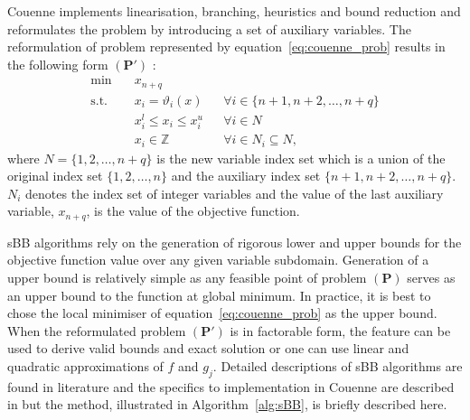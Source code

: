 Couenne implements linearisation, branching, heuristics and bound reduction and reformulates the problem by introducing a set of auxiliary variables. The reformulation of problem represented by equation~\eqref{eq:couenne_prob} results in the following form $(\mathbf{P'})$ \cite{Belotti:2009aa}: 
\begin{equation} \label{eq:couenne_reform}
\begin{aligned}
	\min \quad &x_{n+q}			& \\
	\text{s.t.} \quad &x_i = \vartheta_i \left(x \right)  	& &\forall i \in \{{n+1}, {n+2}, \dots, {n+q} \} \\
	&x_i^l \leq x_i \leq x_i^u	& &\forall i \in N \\
	& x_i \in \mathbb{Z}		& &\forall i \in N_i \subseteq N,
\end{aligned}
\end{equation}
where $N = \{{1}, {2}, \dots, {n+q} \}$ is the new variable index set which is a union of the original index set $\{{1}, {2}, \dots, {n} \}$ and the auxiliary index set $\{{n+1}, {n+2}, \dots, {n+q} \}$. $N_i$ denotes the index set of integer variables and the value of the last auxiliary variable, $x_{n+q}$, is the value of the objective function.

sBB algorithms rely on the generation of rigorous lower and upper bounds for the objective function value over any given variable subdomain. Generation of a upper bound is relatively simple as any feasible point of problem $(\mathbf{P})$ serves as an upper bound to the function at global minimum. In practice, it is best to chose the local minimiser of equation~\eqref{eq:couenne_prob} as the upper bound. When the reformulated problem $(\mathbf{P'})$ is in factorable form, the feature can be used to derive valid bounds and exact solution or one can use linear and quadratic approximations of $f$ and $g_j$. Detailed descriptions of sBB algorithms are found in literature \cite{Smith:1999aa,Liberti:2006aa} and the specifics to implementation in Couenne are described in \cite{Belotti:2009aa} but the method, illustrated in Algorithm~\ref{alg:sBB}, is briefly described here. 
	
